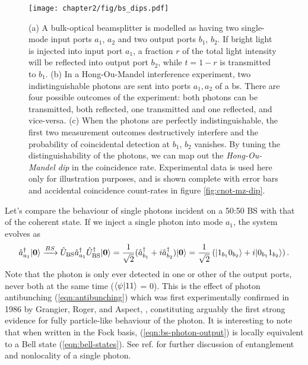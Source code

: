 %
%
\begin{figure}[t!]
\centering
\texttt{[image: chapter2/fig/bs\_dips.pdf]}
\caption[Beamsplitters and Hong-Ou-Mandel interference]{ 
(a) A bulk-optical beamsplitter is modelled as having two single-mode input ports $a_1$, $a_2$ and two output ports $b_1$, $b_2$. If bright light is injected into input port $a_1$, a fraction $r$ of the total light intensity will be reflected into output port $b_2$, while $t = 1-r$ is transmitted to $b_1$. (b) In a Hong-Ou-Mandel interference experiment, two indistinguishable photons are sent into ports $a_1, a_2$ of a \gls{bs}. There are four possible outcomes of the experiment: both photons can be transmitted, both reflected, one transmitted and one reflected, and vice-versa. (c) When the photons are perfectly indistinguishable, the first two measurement outcomes destructively interfere and the probability of coincidental detection at $b_1$, $b_2$ vanishes. By tuning the distinguishability of the photons, we can map out the \emph{Hong-Ou-Mandel dip} in the coincidence rate.  Experimental data is used here only for illustration purposes, and is shown complete with error bars and accidental coincidence count-rates in figure \ref{fig:cnot-mz-dip}.  }
\label{fig:beamsplitter-dips}
\end{figure}
%
%
Let's compare the behaviour of single photons incident on a 50:50 BS with that of the coherent state.
If we inject a single photon into mode $a_1$, the system evolves as
\begin{equation}
    \hat{a}^{\dagger}_{a_1}\mbox{$ | \mathbf{0} \rangle $} \xrightarrow{BS} \hat{U}_\mathrm{BS} \hat{a}^{\dagger}_{a_1} \hat{U}_\mathrm{BS}^\dagger \mbox{$ | \mathbf{0} \rangle $}  = \frac{1}{\sqrt{2}}(\hat{a}^{\dagger}_{b_1} + i\hat{a}^{\dagger}_{b_2})\mbox{$ | \mathbf{0} \rangle $} =
    \frac{1}{\sqrt{2}}\left(\mbox{$ | 1_{b_1}0_{b_2} \rangle $} +i\mbox{$ | 0_{b_1}1_{b_2} \rangle $}\right).
    \label{eqn:bs-photon-output}
\end{equation}
Note that the photon is only ever detected in one or other of the output ports, never both at the same time ($\langle \psi | 11 \rangle$ = 0). This is the effect of photon antibunching (\ref{eqn:antibunching})
which  was first experimentally confirmed in 1986 by Grangier, Roger, and Aspect, \cite{Grangier1986}, constituting arguably the first strong evidence for fully particle-like behaviour of the photon.
It is interesting to note that when written in the Fock basis, (\ref{eqn:bs-photon-output}) is locally equivalent to a Bell state (\ref{eqn:bell-states}). See ref. \cite{Tan1991a} for further discussion of entanglement and nonlocality of a single photon.

